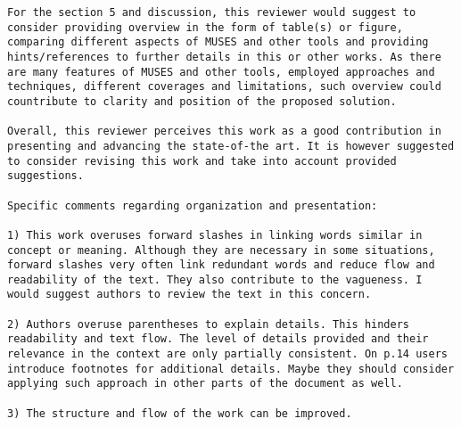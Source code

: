 \documentclass[preprint]{elsarticle}
\begin{document}
\begin{verbatim}
For the section 5 and discussion, this reviewer would suggest to consider providing overview in the form of table(s) or figure, comparing different aspects of MUSES and other tools and providing hints/references to further details in this or other works. As there are many features of MUSES and other tools, employed approaches and techniques, different coverages and limitations, such overview could countribute to clarity and position of the proposed solution.

Overall, this reviewer perceives this work as a good contribution in presenting and advancing the state-of-the art. It is however suggested to consider revising this work and take into account provided suggestions.

Specific comments regarding organization and presentation:

1) This work overuses forward slashes in linking words similar in concept or meaning. Although they are necessary in some situations, forward slashes very often link redundant words and reduce flow and readability of the text. They also contribute to the vagueness. I would suggest authors to review the text in this concern.

2) Authors overuse parentheses to explain details. This hinders readability and text flow. The level of details provided and their relevance in the context are only partially consistent. On p.14 users introduce footnotes for additional details. Maybe they should consider applying such approach in other parts of the document as well.

3) The structure and flow of the work can be improved.
\end{verbatim}
\end{document}
